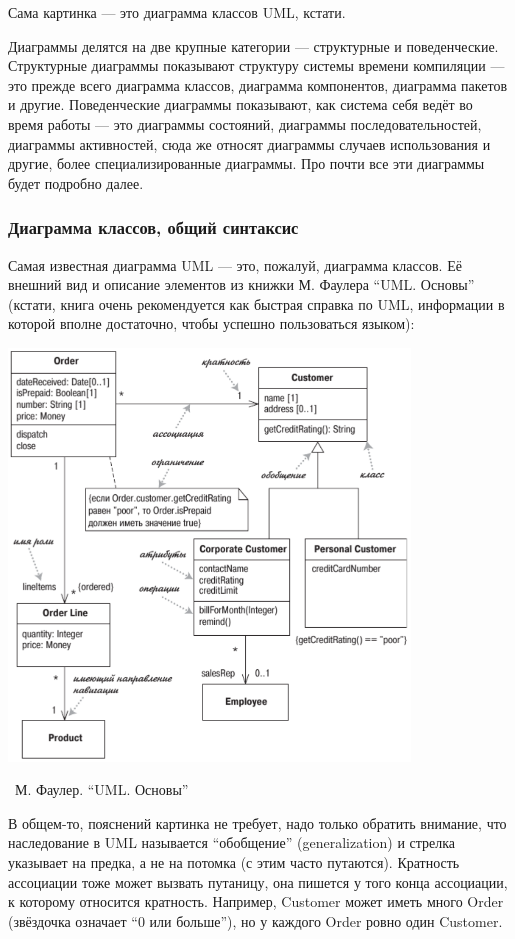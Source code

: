 \documentclass[a5paper]{article}
\newcommand{\attribution}[1] {
	\vspace{-5mm}\begin{flushright}\begin{scriptsize}%
	{\textcopyright\, #1}\end{scriptsize}\end{flushright}
}
\begin{document}
Сама картинка --- это диаграмма классов UML, кстати.

Диаграммы делятся на две крупные категории --- структурные и поведенческие. Структурные диаграммы показывают структуру системы времени компиляции --- это прежде всего диаграмма классов, диаграмма компонентов, диаграмма пакетов и другие. Поведенческие диаграммы показывают, как система себя ведёт во время работы --- это диаграммы состояний, диаграммы последовательностей, диаграммы активностей, сюда же относят диаграммы случаев использования и другие, более специализированные диаграммы. Про почти все эти диаграммы будет подробно далее.

\subsubsection{Диаграмма классов, общий синтаксис}

Самая известная диаграмма UML --- это, пожалуй, диаграмма классов. Её внешний вид и описание элементов из книжки М. Фаулера ``UML. Основы'' (кстати, книга очень рекомендуется как быстрая справка по UML, информации в которой вполне достаточно, чтобы успешно пользоваться языком):

\begin{center}
	\includegraphics[width=0.8\textwidth]{umlClassDiagram.png}
	\attribution{М. Фаулер. ``UML. Основы''}
\end{center}

В общем-то, пояснений картинка не требует, надо только обратить внимание, что наследование в UML называется ``обобщение'' (generalization) и стрелка указывает на предка, а не на потомка (с этим часто путаются). Кратность ассоциации тоже может вызвать путаницу, она пишется у того конца ассоциации, к которому относится кратность. Например, Customer может иметь много Order (звёздочка означает ``0 или больше''), но у каждого Order ровно один Customer. 
\end{document}
